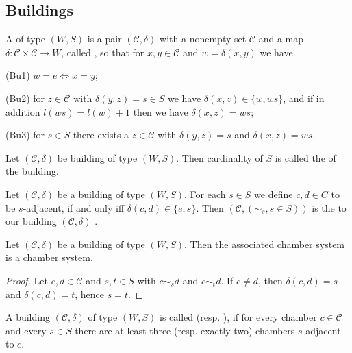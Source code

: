 \subsection{Buildings}

\begin{defi}
	A  of type $(W,S)$ is a pair $(\mathcal{C}, \delta)$ with a nonempty set $\mathcal{C}$ and a map $\delta : \mathcal{C} \times \mathcal{C} \to W$, called , so that for $x,y \in \mathcal C$ and $w = \delta(x,y)$ we have
	\begin{axioms}
		\item[(Bu1)] $w = e \iff x = y$;
		\item[(Bu2)] for $z \in \mathcal C$ with $\delta(y,z) = s \in S$ we have $\delta(x,z) \in \{w,ws\}$, and if in addition $l(ws) = l(w) + 1$ then we have $\delta(x,z) = ws$;
		\item[(Bu3)] for $s \in S$ there exists a $z \in \mathcal C$ with $\delta(y,z) = s$ and $\delta(x,z) = ws$.
	\end{axioms}
\end{defi}

\begin{defi}
	Let $(\mathcal{C}, \delta)$ be building of type $(W,S)$. Then cardinality of $S$ is called the  of the building.
\end{defi}

\begin{defi}
	Let $(\mathcal{C}, \delta)$ be a building of type $(W,S)$. For each $s \in S$ we define $c,d \in C$ to be $s$-adjacent, if and only iff $\delta(c,d) \in \{e,s\}$. Then $(\mathcal{C}, (\sim_s, s \in S))$ is the to our building $(\mathcal{C}, \delta)$ .
\end{defi}

\begin{lemm}
	Let $(\mathcal{C}, \delta)$ be a building of type $(W,S)$. Then the associated chamber system is a chamber system.

	\begin{proof}
		Let $c,d \in \mathcal{C}$ and $s,t \in S$ with $c \sim_s d$ and $c \sim_t d$. If $c \neq d$, then $\delta(c,d) = s$ and $\delta(c,d) = t$, hence $s = t$.
	\end{proof}
\end{lemm}

\begin{defi}
	A building $(\mathcal{C}, \delta)$ of type $(W,S)$ is called  (resp. ), if for every chamber $c \in \mathcal{C}$ and every $s \in S$ there are at least three (resp. exactly two) chambers $s$-adjacent to $c$.
\end{defi}

